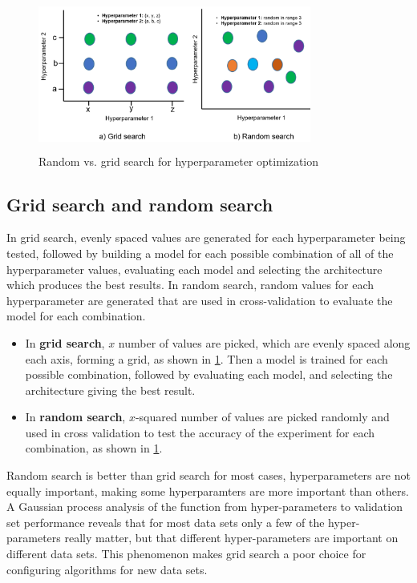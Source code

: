 \begin{figure}[h]
	\centering
	\includegraphics[width=0.8\textwidth,height=50mm]{images/gvr.png}
    \caption{Random vs. grid search for hyperparameter optimization}	
	\label{fig:random_vs_grid_search}
	\vspace{-2mm} 
\end{figure}

\subsection{Grid search and random search}
In grid search, evenly spaced values are generated for each hyperparameter being tested, followed by building a model for each possible combination of all of the hyperparameter values, evaluating each model and selecting the architecture which produces the best results. %
In random search, random values for each hyperparameter are generated that are used in cross-validation to evaluate the model for each combination.

\begin{itemize}[noitemsep]
    \item In \textbf{grid search}, $x$ number of values are picked, which are evenly spaced along each axis, forming a grid, as shown in \cref{fig:random_vs_grid_search}. Then a model is trained for each possible combination, followed by evaluating each model, and selecting the architecture giving the best result.
    \item In \textbf{random search}, $x$-squared number of values are picked randomly and used in cross validation to test the accuracy of the experiment for each combination, as shown in \cref{fig:random_vs_grid_search}.
\end{itemize}

\hspace*{3.5mm} Random search is better than grid search for most cases, hyperparameters are not equally important, making some hyperparamters are more important than others. A Gaussian process analysis of the function from hyper-parameters to validation set performance reveals that for most data sets only a few of the hyper-parameters really matter, but that different hyper-parameters are important on different data sets. This phenomenon makes grid search a poor choice for configuring algorithms for new data sets. %

